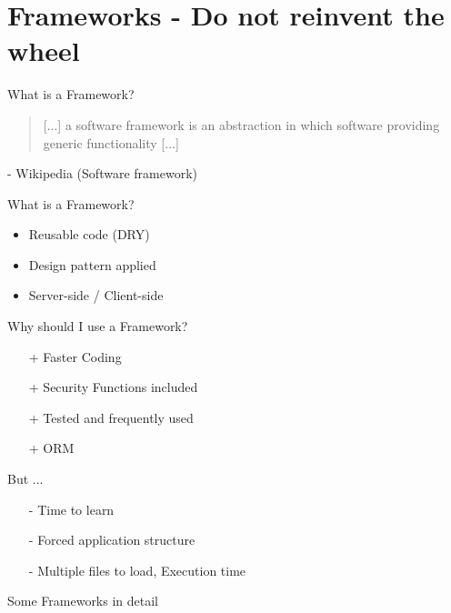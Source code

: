 \section{Frameworks - Do not reinvent the wheel}
\begin{frame}{What is a Framework?}
	\begin{quote}
		[...] a software framework is an abstraction in which software providing generic functionality [...]
	\end{quote}
	- Wikipedia (Software framework)
\end{frame}

\begin{frame}{What is a Framework?}
	\begin{itemize}
		\item Reusable code (DRY)
		\item Design pattern applied
		\item Server-side / Client-side %
	\end{itemize}
\end{frame}

\begin{frame}{Why should I use a Framework?}
	\begin{itemize}
		\item[+] Faster Coding
		\item[+] Security Functions included
		\item[+] Tested and frequently used
		\item[+] ORM
	\end{itemize}
\end{frame}

\begin{frame}{But ...}
	\begin{itemize}
		\item[-] Time to learn
		\item[-] Forced application structure
		\item[-] Multiple files to load, Execution time
	\end{itemize}
\end{frame}

\begin{frame}{Some Frameworks in detail}
\end{frame}


